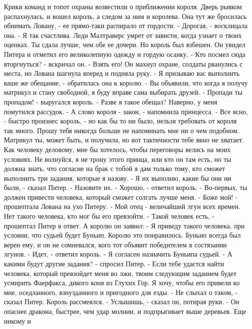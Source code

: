     Крики команд и топот охраны возвестили о приближении короля. Дверь 
рывком распахнулась, и вошел король, а следом за ним и королева. Она 
тут же бросилась обнимать Ловану, - ее прямо-таки распирало от 
гордости.
    - Дорогая, - восклицала она. - Я так счастлива. Леди Малтраверс 
умрет от зависти, когда узнает о твоих оценках. Ты сдала лучше, чем 
обе ее дочери.
    Но король был взбешен. Он увидел Питера и отметил его великолепную 
одежду и гордую осанку.
    - Кто посмел сюда вторгнуться? - вскричал он. - Взять его!
    Он махнул охране, солдаты рванулись с места, но Лована шагнула 
вперед и подняла руку.
    - Я призываю вас выполнить ваше же обещание, - обратилась она к 
королю. - Вы объявили, что когда я получу матрикул и стану свободной, 
я буду вправе сама выбирать друзей.
    - Пропади ты пропадом! - выругался король. - Разве я такое обещал? 
Наверно, у меня помутился рассудок.
    - А слово короля - закон, - напомнила принцесса.
    - Все ясно, - быстро произнес король, - но как бы то ни было, 
нельзя требовать от короля так много. Прошу тебя никогда больше не 
напоминать мне ни о чем подобном. Матрикул ты, может быть, и получила, 
но вот тактичности тебе явно не хватает. Как человеку деловому, мне бы 
хотелось, чтобы переговоры велись на моих условиях. Не волнуйся, я не 
трону этого принца, или кто он там есть, но ты должна знать, что 
согласие на брак с тобой я дам только тому, кто сможет выполнить три 
задания, которые я назову.
    - Я их выполню, какие бы они ни были, - сказал Питер. - Назовите 
их.
    - Хорошо, - ответил король. - Во-первых, ты должен привести 
человека, который сможет солгать лучше меня.
    - Боже мой! - прошептала Лована на ухо Питеру. - Мой отец - 
величайший лгун всех времен. Нет такого человека, кто мог бы его 
превзойти.
    - Такой человек есть, - прошептал Питер в ответ. А королю он 
заявил: - Я приведу такого человека, при условии, что судьей будет 
Буньип.
    Королю это понравилось. Буньип всегда был верен ему, и он не 
сомневался, кого тот объявит победителем в состязании лгунов.
    - Идет, - ответил король. - Я согласен назначить Буньипа судьей.
    - А какими будут другие задания? - спросил Питер.
    - Если тебе удастся найти человека, который превзойдет меня во 
лжи, твоим следующим заданием будет усмирить Фаерфакса, дикого коня из 
Глухих Гор. Я хочу, чтобы его привели ко мне, оседланного, 
взнузданного и пригодного для езды.
    - Не слыхал о таком, - сказал Питер.
    Король рассмеялся.
    - Услышишь, - сказал он, потирая руки. - Он опаснее дракона, 
быстрее, чем удар молнии, и подпрыгивает выше деревьев. Еще никому и 
